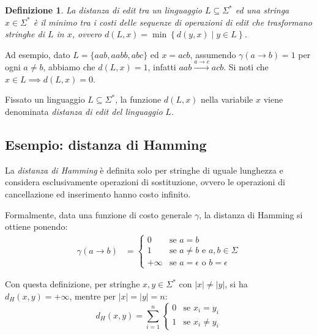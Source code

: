 \documentclass[a4paper,12pt]{report}
\newtheorem{definition}{Definizione}[chapter]
\theoremstyle{propositionstyle}
\begin{document}
    \begin{definition}
        La distanza di edit tra un linguaggio $L \subseteq \Sigma^*$ ed una stringa $x \in \Sigma^*$ è il minimo tra i costi delle sequenze di operazioni di edit
        che trasformano stringhe di $L$ in $x$, ovvero $d\left(L, x\right) = \min\left\{d\left(y, x\right) \mid y \in L \right\}$.
    \end{definition}

    Ad esempio, dato $L = \{aab, aabb, abc\}$ ed $x = acb$, assumendo $\gamma(a \rightarrow b) = 1$ per ogni $a \neq b$, abbiamo che $d\left(L, x\right) = 1$, infatti $aab \xrightarrow{a \rightarrow c} acb$. Si noti che $x \in L \implies d\left(L, x\right) = 0$.

    Fissato un linguaggio $L \subseteq \Sigma^*$, la funzione $d\left(L, x\right)$ nella variabile $x$ viene denominata \textit{distanza di edit del linguaggio} $L$.

    \subsection{Esempio: distanza di Hamming}

    La \textit{distanza di Hamming} è definita solo per stringhe di uguale lunghezza e considera esclusivamente operazioni di sostituzione, ovvero le operazioni di cancellazione ed inserimento hanno costo infinito.

    Formalmente, data una funzione di costo generale $\gamma$, la distanza di Hamming si ottiene ponendo:
    \begin{align}
        \gamma(a \rightarrow b) &= \begin{cases}
                                       0 & \text{se } a = b \\
                                       1 & \text{se } a \neq b \text{ e } a, b \in \Sigma \\
                                       +\infty & \text{se } a = \epsilon \text{ o } b = \epsilon
        \end{cases}
    \end{align}

    Con questa definizione, per stringhe $x, y \in \Sigma^*$ con $|x| \neq |y|$, si ha $d_H(x, y) = +\infty$, mentre per $|x| = |y| = n$:
    \[
        d_H(x, y) = \sum_{i=1}^{n} \begin{cases}
                                       0 & \text{se } x_i = y_i \\
                                       1 & \text{se } x_i \neq y_i
        \end{cases}
    \]
    
\end{document}
